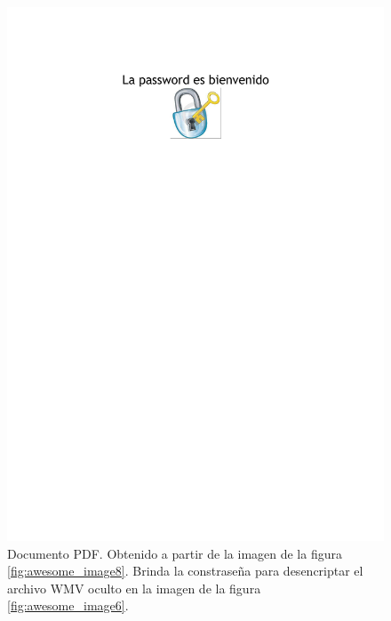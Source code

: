 \documentclass[a4paper,10pt]{article}
\begin{document}
\begin{figure}[!htb]
\begin{center}
%
 \includegraphics[scale=0.25]{./images/loimposible-out.pdf}
  \caption{Documento PDF. Obtenido a partir de la imagen de la figura \ref{fig:awesome_image8}. Brinda la constraseña para desencriptar el archivo 
    WMV oculto en la imagen de la figura \ref{fig:awesome_image6}.}\label{fig:awesome_image10}
\endminipage
\end{center}
\end{figure}
\end{document}
